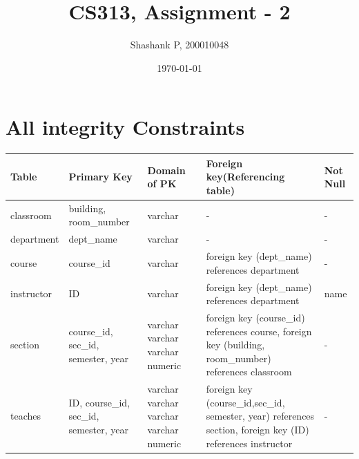 \documentclass{article}
\title{CS313, Assignment - 2}
\author{Shashank P, 200010048}
\date{\today}
\begin{document}
\maketitle

\section{All integrity Constraints}

    \begin{table}[ht]
\begin{tabular}{|p{2cm}|p{2cm}|p{2cm}|p{3cm}|p{1cm}|}
\hline    

\textbf{Table} & \textbf{Primary Key}  & \textbf{Domain of PK} & \textbf{Foreign key(Referencing
table)} & \textbf{Not Null}\\
 \hline
 
classroom & building, room\_number  & varchar & - & - \\ \hline
department & dept\_name  & varchar & - & - \\ \hline

course & course\_id  & varchar & foreign key (dept\_name) \newline references \newline department & - \\ \hline

instructor & ID  & varchar & foreign key (dept\_name) \newline references \newline department & name \\ \hline

section & course\_id, sec\_id, semester, year & varchar \newline varchar \newline varchar \newline numeric & foreign key (course\_id) \newline references course, \newline
	 foreign key (building, room\_number) references classroom & - \\ \hline
	 
teaches & ID, course\_id, sec\_id, semester, year & varchar \newline varchar \newline varchar \newline varchar \newline numeric \newline & foreign key (course\_id,sec\_id, semester, year) references \newline section,
	 foreign key (ID) references instructor & -\\ \hline
	 

\end{tabular}
\end{table}
\end{document}
